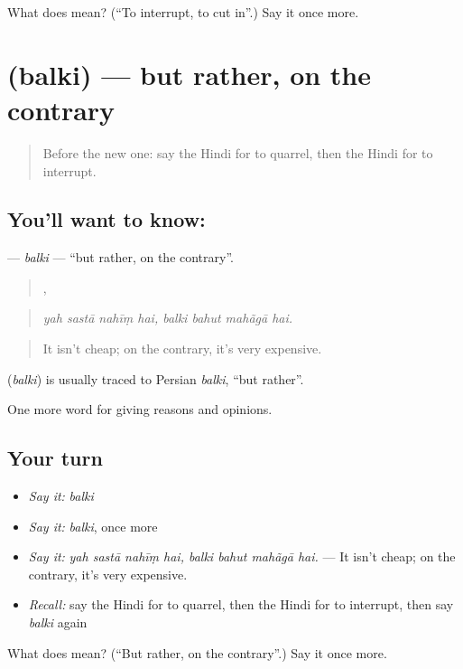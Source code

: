 \begin{tcolorbox}[breakable,colback=teal!4,colframe=teal!35!black,title={Before you move on}]
What does  mean? (\textquotedblleft{}To interrupt, to cut in\textquotedblright{}.) Say it once more.
\end{tcolorbox}
\section[\texorpdfstring{\hi{बल्कि} (balki)}{बल्कि (balki)}]{ (balki) — but rather, on the contrary}

\label{lesson:HI-C346-balki}



\begin{quote}
Before the new one: say the Hindi for to quarrel, then the Hindi for to interrupt.
\end{quote}

\subsection*{You'll want to know: }
\textbf{} — \emph{balki} — \textquotedblleft{}but rather, on the contrary\textquotedblright{}.

\begin{quote}
   ,    
\end{quote}

\begin{quote}
\emph{yah sastā nahīṃ hai, balki bahut mahãgā hai.}
\end{quote}

\begin{quote}
It isn't cheap; on the contrary, it's very expensive.
\end{quote}

\begin{cousinweb}
\textbf{} (\emph{balki}) is usually traced to Persian \emph{balki}, \textquotedblleft{}but rather\textquotedblright{}.
\end{cousinweb}

\begin{grammarlens}[title={What you've built}]
One more word for giving reasons and opinions.
\end{grammarlens}

\subsection*{Your turn}
\begin{itemize}
\raggedright
  \item \emph{Say it:} \emph{balki}
  \item \emph{Say it:} \emph{balki}, once more
  \item \emph{Say it:} \emph{yah sastā nahīṃ hai, balki bahut mahãgā hai.} — It isn't cheap; on the contrary, it's very expensive.
  \item \emph{Recall:} say the Hindi for to quarrel, then the Hindi for to interrupt, then say \emph{balki} again
\end{itemize}

\begin{tcolorbox}[breakable,colback=teal!4,colframe=teal!35!black,title={Before you move on}]
What does  mean? (\textquotedblleft{}But rather, on the contrary\textquotedblright{}.) Say it once more.
\end{tcolorbox}
